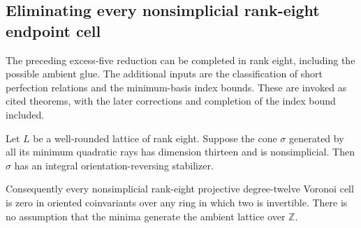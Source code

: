 \subsection{Eliminating every nonsimplicial rank-eight endpoint cell}
\label{subsec:k12-r8-nonsimplicial}

The preceding excess-five reduction can be completed in rank eight,
including the possible ambient glue. The additional inputs are the
classification of short perfection relations and the minimum-basis
index bounds. These are invoked as cited theorems, with the later
corrections and completion of the index bound included.

\begin{theorem}[K17-K12-R8-NONSIMPLICIAL]
\label{thm:k12-r8-nonsimplicial}
Let $L$ be a well-rounded lattice of rank eight. Suppose the cone
$\sigma$ generated by all its minimum quadratic rays has dimension
thirteen and is nonsimplicial. Then $\sigma$ has an integral
orientation-reversing stabilizer.

Consequently every nonsimplicial rank-eight projective degree-twelve
Voronoi cell is zero in oriented coinvariants over any ring in which
two is invertible. There is no assumption that the minima generate
the ambient lattice over $\mathbb Z$.
\end{theorem}

